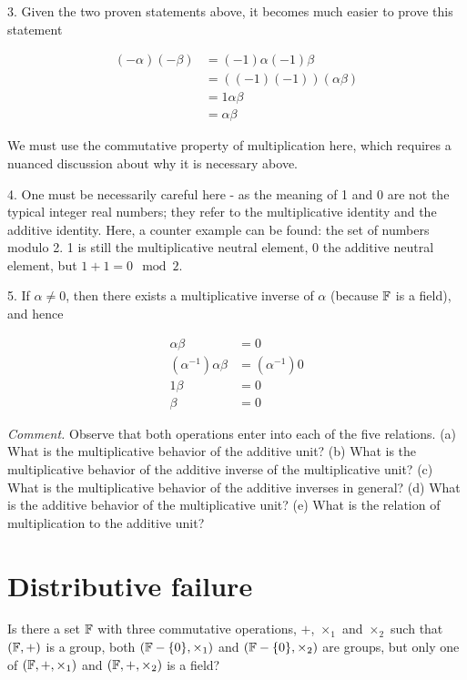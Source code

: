 3. Given the two proven statements above, it becomes much easier to prove this statement

\begin{align}
    (-\alpha)(-\beta) & = (-1)\alpha(-1)\beta     \\
                      & = ((-1)(-1))(\alpha\beta) \\
                      & = 1\alpha\beta            \\
                      & = \alpha\beta
\end{align}

We must use the commutative property of multiplication here, which requires a nuanced discussion about why it is necessary above.

4. One must be necessarily careful here - as the meaning of 1 and 0 are not the typical integer real numbers; they refer to the multiplicative identity and the additive identity. Here, a counter example can be found: the set of numbers modulo 2. 1 is still the multiplicative neutral element, 0 the additive neutral element, but $1 + 1 = 0 \mod 2$.

5. If $\alpha \neq 0$, then there exists a multiplicative inverse of $\alpha$ (because $\mathbb{F}$ is a field), and hence

\begin{align}
    \alpha \beta               & = 0              \\
    (\alpha^{-1}) \alpha \beta & = (\alpha^{-1})0 \\
    1 \beta                    & = 0              \\
    \beta                      & = 0
\end{align}

\textit{Comment.} Observe that both operations enter into each of the five relations. (a) What is the multiplicative behavior of the additive unit? (b) What is the multiplicative behavior of the additive inverse of the multiplicative unit? (c) What is the multiplicative behavior of the additive inverses in general? (d) What is the additive behavior of the multiplicative unit? (e) What is the relation of multiplication to the additive unit?

\section{Distributive failure}

\begin{problem}
Is there a set $\mathbb{F}$ with three commutative operations, $+$, $\times_1$ and $\times_2$ such that $(\mathbb{F},+)$ is a group, both $(\mathbb{F} - \{0\}, \times_1)$ and $(\mathbb{F} - \{0\}, \times_2)$ are groups, but only one of $(\mathbb{F},+, \times_1)$ and $(\mathbb{F}, +, \times_2)$ is a field?
\end{problem}

